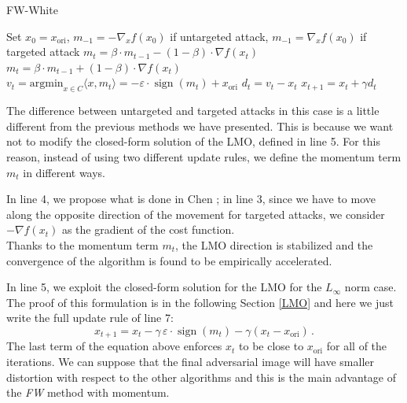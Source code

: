 \documentclass[10pt,twocolumn,letterpaper, english]{article}
\newcommand{\sign}{\mathop{\mathrm{sign}}}
\theoremstyle{definition}
\theoremstyle{plain}
\theoremstyle{plain}
\theoremstyle{plain}
\theoremstyle{plain}
\theoremstyle{remark}
\theoremstyle{remark}
\theoremstyle{definition}
\theoremstyle{definition}
\theoremstyle{definition}
\theoremstyle{definition}
\renewcommand{\epsilon}{\varepsilon}
\begin{document}
\begin{algorithm}
\caption{FW-White}\label{FW}
\begin{algorithmic}[1]

\State Set $x_0 = x_{\text{ori}}$, $m_{-1} = - \nabla_x f(x_0)$ if untargeted attack, $m_{-1} = \nabla_x f(x_0)$ if targeted attack
    \State $m_t = \beta \cdot m_{t-1} - (1-\beta) \cdot \nabla f(x_t) $ 
    \State $m_t = \beta \cdot m_{t-1} + (1-\beta) \cdot \nabla f(x_t) $ 
    \State $v_t = \text{argmin}_{x \in C} \langle x, m_t \rangle = - \epsilon \cdot \sign (m_t) + x_{\text{ori}} $
    \State $d_t = v_t - x_t $
    \State $x_{t+1} = x_t + \gamma d_t $
    
\EndFor
\end{algorithmic}
\end{algorithm}

The difference between untargeted and targeted attacks in this case is a little different from the previous methods we have presented. 
This is because we want not to modify the closed-form solution of the LMO, defined in line 5. 
For this reason, instead of using two different update rules, we define the momentum term $m_t$ in different ways. 

In line 4, we propose what is done in Chen \cite{frank}; in line 3, since we have to move along the opposite direction of the movement for targeted attacks, we consider $- \nabla f(x_t)$ as the gradient of the cost function. \\

Thanks to the momentum term $m_t$, the LMO direction is stabilized and the convergence of the algorithm is found to be empirically accelerated. 

In line 5, we exploit the closed-form solution for the LMO for the $L_\infty$ norm case. 
The proof of this formulation is in the following Section \ref{LMO} and here we just write the full update rule of line 7:
\begin{equation*}
    x_{t+1} = x_t - \gamma \, \epsilon \cdot \sign(m_t) - \gamma (x_t - x_{\text{ori}}) \,.
\end{equation*}
The last term of the equation above enforces $x_t$ to be close to $x_{\text{ori}}$ for all of the iterations. 
We can suppose that the final adversarial image will have smaller distortion with respect to the other algorithms and this is the main advantage of the \textit{FW} method with momentum. 
\end{document}
